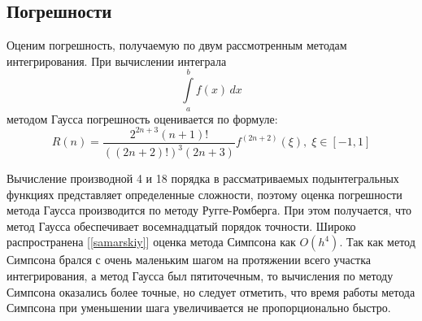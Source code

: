 \subsection{Погрешности}
Оценим погрешность, получаемую по двум рассмотренным методам интегрирования.
При вычислении интеграла 
\begin{equation}
\int\limits^b_af(x)\,dx
\end{equation}
методом Гаусса погрешность оценивается по формуле:  
\begin{equation}
R(n) = \dfrac{2^{2n+3}(n+1)!}{((2n+2)!)^3(2n+3)}f^{(2n+2)}(\xi),\; \xi \in [-1, 1]
\end{equation}

Вычисление производной 4 и 18 порядка в рассматриваемых подынтегральных функциях представляет определенные сложности,
поэтому оценка погрешности метода Гаусса производится по методу Ругге-Ромберга. При этом получается, что метод Гаусса 
обеспечивает восемнадцатый порядок точности. Широко распространена [\ref{samarskiy}] оценка метода Симпсона как $O(h^4)$.
Так как метод Симпсона брался с очень маленьким шагом на протяжении всего участка интегрирования, а метод Гаусса был пятиточечным, то вычисления по методу Симпсона оказались более точные, но следует отметить, что время работы метода Симпсона при уменьшении шага увеличивается не пропорционально быстро.